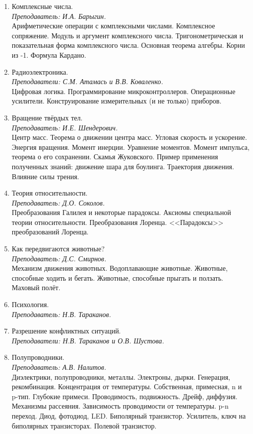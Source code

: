 \documentclass[12pt]{article}
\newlength{\h}
\newlength{\x}
\begin{document}
\begin{enumerate}
\item Комплексные числа.\\[0.2cm]
  \textit{Преподаватель: И.А. Барыгин.}\\[0.2cm]
  Арифметические операции с комплексными числами. Комплексное
  сопряжение. Модуль и аргумент комплексного числа. Тригонометрическая
  и показательная форма комплексного числа. Основная теорема
  алгебры. Корни из -1. Формула Кардано.
\item Радиоэлектроника. \\[0.2cm]
  \textit{Преподаватели: С.М. Атамась и В.В. Коваленко.}\\[0.2cm]
  Цифровая логика. Программирование микроконтроллеров. Операционные
  усилители. Конструирование измерительных (и не только) приборов. 

\item Вращение твёрдых тел. \\[0.2cm]
  \textit{Преподаватель: И.Е. Шендерович.}\\[0.2cm]
  Центр масс. Теорема о движении центра масс. Угловая скорость и
  ускорение. Энергия вращения. Момент инерции. Уравнение
  моментов. Момент импульса, теорема о его сохранении. Скамья
  Жуковского. Пример применения полученных знаний: движение шара для
  боулинга. Траектория движения. Влияние силы трения. 
\item Теория относительности. \\[0.2cm]
  \textit{Преподаватель: Д.О. Соколов.}\\[0.2cm]
  Преобразования Галилея и некоторые парадоксы. Аксиомы специальной
  теории относительности. Преобразования Лоренца. <<Парадоксы>>
  преобразований Лоренца. 
\item Как передвигаются животные? \\[0.2cm]
  \textit{Преподаватель: Д.С. Смирнов.}\\[0.2cm]
  Механизм движения животных. Водоплавающие животные. Животные,
  способные ходить и бегать. Животные, способные прыгать и
  ползать. Маховый полёт.
\item Психология. \\[0.2cm]
  \textit{Преподаватель: Н.В. Тараканов.}
\item Разрешение конфликтных ситуаций. \\[0.2cm]
  \textit{Преподаватели: Н.В. Тараканов и О.В. Шустова.}
\item Полупроводники. \\[0.2cm]
  \textit{Преподаватель: А.В. Налитов. }\\[0.2cm]
  Диэлектрики, полупроводники, металлы. Электроны, дырки. Генерация,
  рекомбинация. Концентрация от температуры. Собственная, примесная, n
  и p-тип. Глубокие примеси. Проводимость, подвижность. Дрейф,
  диффузия. Механизмы рассеяния. Зависимость проводимости от
  температуры. p-n переход. Диод, фотодиод, LED. Биполярный
  транзистор. Усилитель, ключ на биполярных транзисторах. Полевой
  транзистор.
\end{enumerate}
\end{document}

